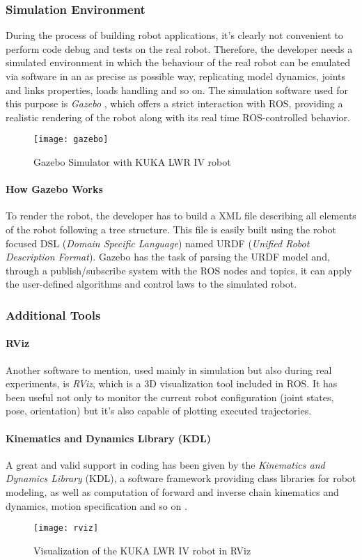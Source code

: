 \subsubsection{Simulation Environment}
During the process of building robot applications, it's clearly not convenient to perform code debug and tests on the real robot. Therefore, the developer needs a simulated environment in which the behaviour of the real robot can be emulated via software in an as precise as possible way, replicating model dynamics, joints and links properties, loads handling and so on. The simulation software used for this purpose is \textit{Gazebo} \cite{webgazebo}, which offers a strict interaction with ROS, providing a realistic rendering of the robot along with its real time ROS-controlled behavior. 

\begin{figure}[H]
\centering
\texttt{[image: gazebo]} 
\caption{Gazebo Simulator with KUKA LWR IV robot}
\end{figure}


\paragraph{How Gazebo Works}
To render the robot, the developer has to build a XML file describing all elements of the robot following a tree structure. This file is easily built using the robot focused DSL (\textit{Domain Specific Language}) named URDF (\textit{Unified Robot Description Format}). Gazebo has the task of parsing the URDF model and, through a publish/subscribe system with the ROS nodes and topics, it can apply the user-defined algorithms and control laws to the simulated robot.

\subsubsection{Additional Tools}
\paragraph{RViz}
Another software to mention, used mainly in simulation but also during real experiments, is \textit{RViz}, which is a 3D visualization tool included in ROS. It has been useful not only to monitor the current robot configuration (joint states, pose, orientation) but it's also capable of plotting executed trajectories.

\paragraph{Kinematics and Dynamics Library (KDL)}
A great and valid support in coding has been given by the \textit{Kinematics and Dynamics Library} (KDL), a software framework providing class libraries for robot modeling, as well as computation of forward and inverse chain kinematics and dynamics, motion specification and so on \cite{webkdl}.

\begin{figure}[H]
\centering
\texttt{[image: rviz]} 
\caption{Visualization of the KUKA LWR IV robot in RViz}
\end{figure}